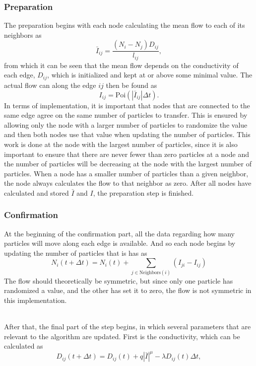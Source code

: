 \subsubsection{Preparation}
The preparation begins with each node calculating the mean flow to each of its neighbors as
\begin{equation}
\bar{I}_{ij} = \frac{(N_i - N_j)D_{ij}}{l_{ij}},
\end{equation}
from which it can be seen that the mean flow depends on the conductivity of each edge, $D_{ij}$, which is initialized and kept at or above some minimal value.
The actual flow can along the edge $ij$ then be found as
\begin{equation}
I_{ij} = \text{Poi}(|\bar{I}_{ij}|\Delta t).
\end{equation}
In terms of implementation, it is important that nodes that are connected to the same edge agree on the same number of particles to transfer. This is ensured by allowing only the node with a larger number of particles to randomize the value and then both nodes use that value when updating the number of particles. This work is done at the node with the largest number of particles, since it is also important to ensure that there are never fewer than zero particles at a node and the number of particles will be decreasing at the node with the largest number of particles. When a node has a smaller number of particles than a given neighbor, the node always calculates the flow to that neighbor as zero. After all nodes have calculated and stored $\bar{I}$ and $I$, the preparation step is finished.

\subsubsection{Confirmation}
At the beginning of the confirmation part, all the data regarding how many particles will move along each edge is available. And so each node begins by updating the number of particles that is has as
 \begin{equation}
 N_i(t + \Delta t) = N_i(t) + \sum_{j \in \text{Neighbors}(i)} \left( I_{ji} - I_{ij} \right)
 \end{equation}
 The flow should theoretically be symmetric, but since only one particle has randomized a value, and the other has set it to zero, the flow is not symmetric in this implementation.
 
 \ \\
 
\noindent After that, the final part of the step begins, in which several parameters that are relevant to the algorithm are updated. First is the conductivity, which can be calculated as
\begin{equation}
D_{ij}(t + \Delta t) = D_{ij}(t) + q|\bar{I}|^\mu - \lambda D_{ij}(t)\Delta t,
\end{equation}

